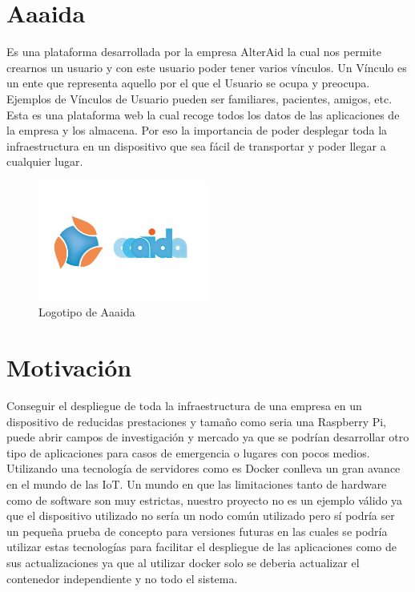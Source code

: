 \section{Aaaida}
Es una plataforma desarrollada por la empresa AlterAid la cual nos permite crearnos un usuario y con este usuario poder tener varios vínculos. Un Vínculo es un ente que representa aquello por el que el Usuario se ocupa y preocupa. Ejemplos de Vínculos de Usuario pueden ser familiares, pacientes, amigos, etc. 
Esta es una plataforma web la cual recoge todos los datos de las aplicaciones de la empresa y los almacena. Por eso la importancia de poder desplegar toda la infraestructura en un dispositivo que sea fácil de transportar y poder llegar a cualquier lugar.
\newpage
\begin{figure}[htb]
\begin{center}
\includegraphics[width=0.5\textwidth]{./setup/aaaidaLogo}
\caption{Logotipo de Aaaida}
\label{F:prova}
\end{center}
\end{figure}





\section{Motivación}

Conseguir el despliegue de toda la infraestructura de una empresa en un dispositivo de reducidas prestaciones y tamaño como seria una Raspberry Pi, puede abrir campos de investigación y mercado ya que se podrían desarrollar otro tipo de aplicaciones para casos de emergencia o lugares con pocos medios. 
Utilizando una tecnología de servidores como es Docker conlleva un gran avance en el mundo de las IoT.
Un mundo en que las limitaciones tanto de hardware como de software son muy estrictas, nuestro proyecto no es un ejemplo válido ya que el dispositivo utilizado no sería un nodo común utilizado pero sí podría ser un pequeña prueba de concepto para versiones futuras en las cuales se podría utilizar estas tecnologías para facilitar el despliegue de las aplicaciones como de sus actualizaciones ya que al utilizar docker solo se deberia actualizar el contenedor independiente y no todo el sistema.

